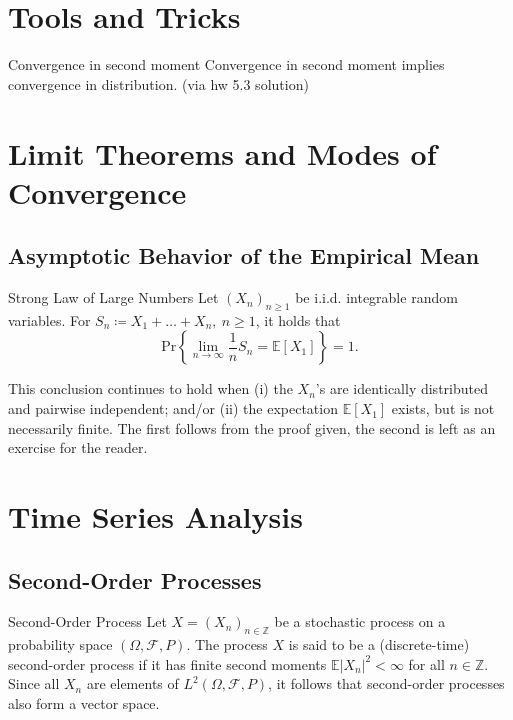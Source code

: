 \documentclass{article}
\begin{document}

\tableofcontents

\newpage

\section{Tools and Tricks}

\begin{rmk}{Convergence in second moment }{}
Convergence in second moment implies convergence in distribution. 
(via hw 5.3 solution)
\end{rmk}

\newpage

\section{Limit Theorems and Modes of Convergence}

\subsection{Asymptotic Behavior of the Empirical Mean}

\begin{thrm}{Strong Law of Large Numbers}{}
Let \( (X_{n} )_{n\geq 1} \) be i.i.d. integrable random variables. For \( S_{n} \coloneqq X_1 + \dots + X_{n}, \ n\geq 1 \), it holds that 
\[
    \mathrm{Pr} \left\{ \lim_{n \to \infty} \frac{1}{n}S_{n}  =\mathbb{E} [X_1] \right\}  = 1. 
\]
\end{thrm}

\begin{rmk}{}{}
This conclusion continues to hold when (i) the \( X_{n}  \)'s are identically  distributed and pairwise independent; and/or (ii) the expectation \( \mathbb{E}[X_1]  \) exists, but is not necessarily finite. The first follows from the proof given, the second is left as an exercise for the reader. 
\end{rmk}

\section{Time Series Analysis}

\subsection{Second-Order Processes}

\begin{defn}{Second-Order Process}{}
    Let \( X = (X_{n} )_{n\in \mathbb{Z} } \) be a stochastic process on a probability space \( (\Omega ,\mathcal{F},P) \). The process \( X \) is said to be a (discrete-time) second-order process if it has finite second moments \( \mathbb{E} |X_{n} |^{2} < \infty  \) for all \( n \in \mathbb{Z}  \). Since all \( X_{n}  \) are elements of \( L^2(\Omega ,\mathcal{F} ,P) \), it follows that second-order processes also form a vector space. 
\end{defn}
\end{document}

